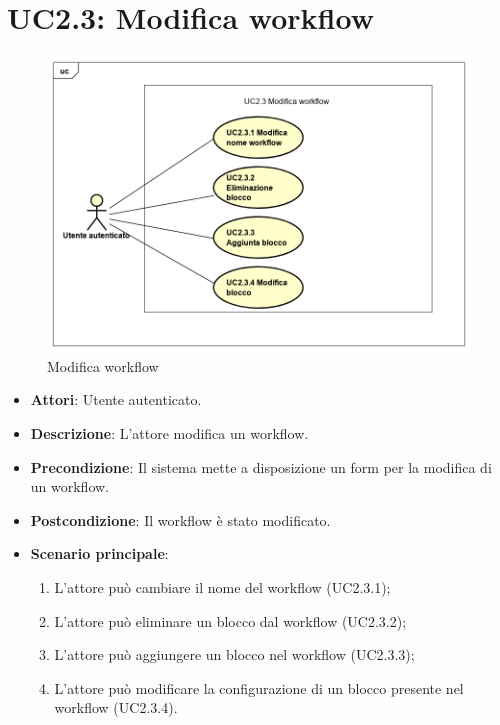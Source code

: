 \section{UC2.3: Modifica workflow}
\label{UC2.3}
\begin{figure} [h]
	\centering
	\includegraphics[scale=0.4]{./Diagram/UC2-3.png}
	\caption{Modifica workflow}\label{}
\end{figure}
\begin{itemize}
	\item \textbf{Attori}: Utente autenticato.
	\item \textbf{Descrizione}: L'attore modifica un workflow.
	\item \textbf{Precondizione}: Il sistema mette a disposizione un form per la modifica di un workflow.
	\item \textbf{Postcondizione}: Il workflow è stato modificato.
	\item \textbf{Scenario principale}:
	\begin{enumerate} \item L'attore può cambiare il nome del workflow (UC2.3.1);  \item  L'attore può eliminare un blocco dal workflow (UC2.3.2);  \item 
		L'attore può aggiungere un blocco nel workflow (UC2.3.3);  \item  L'attore può modificare la configurazione di un blocco presente nel workflow (UC2.3.4).\end{enumerate}
\end{itemize}

